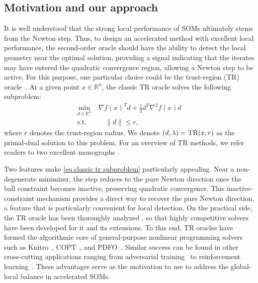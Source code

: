 \documentclass{article}
\begin{document}
\subsection{Motivation and our approach}\label{sec.motivation}
It is well understood that the strong local performance of SOMs ultimately stems from the Newton step. Thus, to design an accelerated method with excellent local performance, the second-order oracle should have the ability to detect the local geometry near the optimal solution, providing a signal indicating that the iterates may have
entered the quadratic convergence region, allowing a Newton step to be active.
For this purpose, one particular choice could be the trust-region (TR) oracle~\cite{more1983recent,conn2000trust}. At a given point \( x \in \mathbb{R}^n \), the classic TR oracle solves the following subproblem:
\begin{equation}
    \label{eq.classic tr subproblem}
    \begin{aligned}
        \underset{d \in \mathbb{R}^n}{\min}~ & \nabla f(x)^T d + \tfrac{1}{2} d^T \nabla^2 f(x)  d \\
        \text{s.t.}                          & \quad  \|d\| \le r,
    \end{aligned}
\end{equation}
where \( r \) denotes the trust-region radius. We denote $(d,\lambda) = \textrm{TR}(x, r)$ as the primal-dual solution to this problem. For an overview of TR methods, we refer readers to two excellent monographs \cite{yuan2000review,yuan2015recent}.

Two features make \eqref{eq.classic tr subproblem} particularly appealing. Near a non-degenerate minimizer, the step reduces to the pure Newton direction once the ball constraint becomes inactive, preserving quadratic convergence. This inactive-constraint mechanism provides a direct way to recover the pure Newton direction, a feature that is particularly convenient for local detection.
On the practical side, the TR oracle has been thoroughly analyzed \cite{jiang2022holderian,rojas2001new,honguyen2017second,wang2022generalized,so2007on,so2011deterministic}, so that highly competitive solvers have been developed \cite{rojas2001new, adachi2017solving, adachi2019eigenvalue} for it and its extensions.
To this end, TR oracles have formed the algorithmic core of general-purpose nonlinear programming solvers such as Knitro~\cite{byrd2006knitro}, COPT~\cite{ge2022cardinal}, and PDFO~\cite{ragonneau2024pdfo}. Similar success can be found in other cross-cutting applications ranging from adversarial training~\cite{yao2019trust} to reinforcement learning~\cite{schulman2015trust}. These advantages serve as the motivation to use \tr{} to address the global-local balance in accelerated SOMs.
\end{document}
